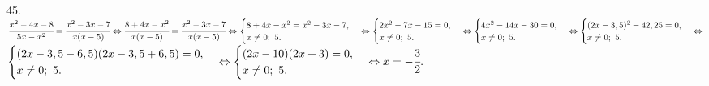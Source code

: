 45. $\cfrac{x^2-4x-8}{5x-x^2}=\cfrac{x^2-3x-7}{x(x-5)}\Leftrightarrow\cfrac{8+4x-x^2}{x(x-5)}=\cfrac{x^2-3x-7}{x(x-5)}\Leftrightarrow
\begin{cases} 8+4x-x^2=x^2-3x-7,\\ x\neq0;\ 5.\end{cases}\Leftrightarrow
\begin{cases} 2x^2-7x-15=0,\\ x\neq0;\ 5.\end{cases}\Leftrightarrow
\begin{cases} 4x^2-14x-30=0,\\ x\neq0;\ 5.\end{cases}\Leftrightarrow
\begin{cases} (2x-3,5)^2-42,25=0,\\ x\neq0;\ 5.\end{cases}\Leftrightarrow$\\$
\begin{cases} (2x-3,5-6,5)(2x-3,5+6,5)=0,\\ x\neq0;\ 5.\end{cases}\Leftrightarrow
\begin{cases} (2x-10)(2x+3)=0,\\ x\neq0;\ 5.\end{cases}\Leftrightarrow
x=-\cfrac{3}{2}.$\\
